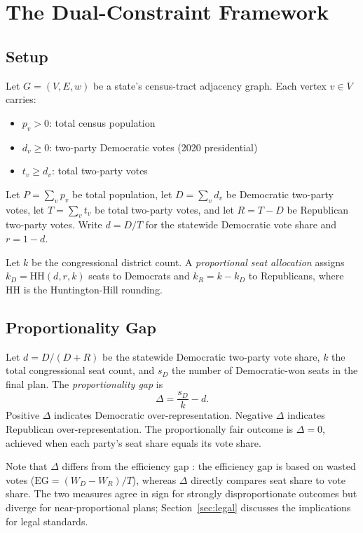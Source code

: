 \section{The Dual-Constraint Framework}
\label{sec:framework}

\subsection{Setup}

Let $G = (V, E, w)$ be a state's census-tract adjacency graph.
Each vertex $v \in V$ carries:
\begin{itemize}
  \item $p_v > 0$: total census population
  \item $d_v \geq 0$: two-party Democratic votes (2020 presidential)
  \item $t_v \geq d_v$: total two-party votes
\end{itemize}

Let $P = \sum_v p_v$ be total population, let $D = \sum_v d_v$ be Democratic
two-party votes, let $T = \sum_v t_v$ be total two-party votes, and let
$R = T-D$ be Republican two-party votes.
Write $d = D/T$ for the statewide Democratic vote share and $r = 1 - d$.

Let $k$ be the congressional district count.
A \emph{proportional seat allocation} assigns $k_D = \mathrm{HH}(d, r, k)$
seats to Democrats and $k_R = k - k_D$ to Republicans, where $\mathrm{HH}$
is the Huntington-Hill rounding.

\subsection{Proportionality Gap}

\begin{definition}
\label{def:pgap}
Let $d = D/(D+R)$ be the statewide Democratic two-party vote share, $k$ the
total congressional seat count, and $s_D$ the number of Democratic-won seats
in the final plan.
The \emph{proportionality gap} is
\[
  \Delta = \frac{s_D}{k} - d.
\]
Positive $\Delta$ indicates Democratic over-representation.
Negative $\Delta$ indicates Republican over-representation.
The proportionally fair outcome is $\Delta = 0$, achieved when each party's
seat share equals its vote share.
\end{definition}

\noindent Note that $\Delta$ differs from the efficiency gap \citep{stephanopoulos2015}:
the efficiency gap is based on wasted votes ($\text{EG} = (W_D - W_R)/T$),
whereas $\Delta$ directly compares seat share to vote share.
The two measures agree in sign for strongly disproportionate outcomes but
diverge for near-proportional plans; Section~\ref{sec:legal} discusses the
implications for legal standards.

